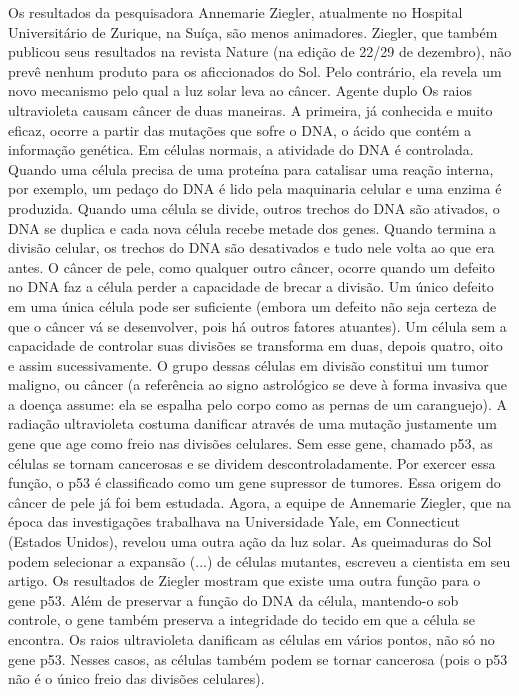 Os resultados da pesquisadora Annemarie Ziegler, atualmente no Hospital Universitário de Zurique, na Suíça, são menos animadores.
Ziegler, que também publicou seus resultados na revista  Nature (na edição de 22/29 de dezembro), não prevê nenhum produto para os aficcionados do Sol. Pelo contrário, ela revela um novo mecanismo pelo qual a luz solar leva ao câncer.
Agente duplo 
Os raios ultravioleta causam câncer de duas maneiras. A primeira, já conhecida e muito eficaz, ocorre a partir das mutações que sofre o DNA, o ácido que contém a informação genética.
Em células normais, a atividade do DNA é controlada. Quando uma célula precisa de uma proteína para catalisar uma reação interna, por exemplo, um pedaço do DNA é lido pela maquinaria celular e uma enzima é produzida.
Quando uma célula se divide, outros trechos do DNA são ativados, o DNA se duplica e cada nova célula recebe metade dos genes. Quando termina a divisão celular, os trechos do DNA são desativados e tudo nele volta ao que era antes.
O câncer de pele, como qualquer outro câncer, ocorre quando um defeito no DNA faz a célula perder a capacidade de brecar a divisão.
Um único defeito em uma única célula pode ser suficiente (embora um defeito não seja certeza de que o câncer vá se desenvolver, pois há outros fatores atuantes).
Um célula sem a capacidade de controlar suas divisões se transforma em duas, depois quatro, oito e assim sucessivamente.
O grupo dessas células em divisão constitui um tumor maligno, ou câncer (a referência ao signo astrológico se deve à forma invasiva que a doença assume: ela se espalha pelo corpo como as pernas de um caranguejo).
A radiação ultravioleta costuma danificar através de uma mutação justamente um gene que age como freio nas divisões celulares.
Sem esse gene, chamado p53, as células se tornam cancerosas e se dividem descontroladamente. Por exercer essa função, o p53 é classificado como um gene supressor de tumores.
Essa origem do câncer de pele já foi bem estudada. Agora, a equipe de Annemarie Ziegler, que na época das investigações trabalhava na Universidade Yale, em Connecticut (Estados Unidos), revelou uma outra ação da luz solar.
 As queimaduras do Sol podem selecionar a expansão (...) de células mutantes, escreveu a cientista em seu artigo.
Os resultados de Ziegler mostram que existe uma outra função para o gene p53.
Além de preservar a função do DNA da célula, mantendo-o sob controle, o gene também preserva a integridade do tecido em que a célula se encontra.
Os raios ultravioleta danificam as células em vários pontos, não só no gene p53.
Nesses casos, as células também podem se tornar cancerosa (pois o p53 não é o único freio das divisões celulares).

